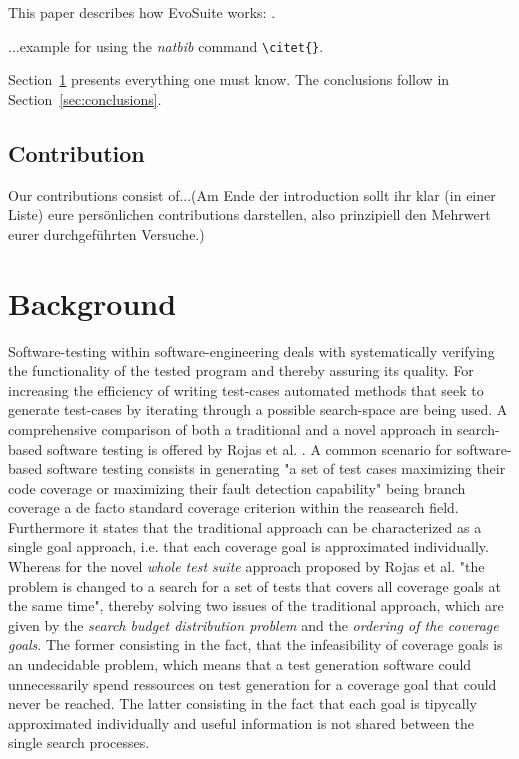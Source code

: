 \documentclass[pdftex,english,oribibl]{llncs}
\begin{document}
This paper describes how EvoSuite works: \citet{fraser2011evosuite}.



...example for using the \textit{natbib} command \texttt{\textbackslash{}citet\{\}}.

  Section~\ref{sec:anotherSection} presents everything one must know. The conclusions follow in Section~\ref{sec:conclusions}.

\subsection{Contribution}

Our contributions consist of...(Am Ende der introduction sollt ihr klar (in einer Liste) eure persönlichen contributions darstellen, also prinzipiell den Mehrwert eurer durchgeführten Versuche.)


\section{Background}\label{sec:anotherSection}
Software-testing within software-engineering deals with systematically verifying the functionality of the tested program and thereby assuring its quality. For increasing the efficiency of writing test-cases automated methods that seek to generate test-cases by iterating through a possible search-space are being used. A comprehensive comparison of both a traditional and a novel approach in search-based software testing is offered by Rojas et al. \citep{rojas2017detailed}. A common scenario for software-based software testing consists in generating "a set of test cases maximizing their code coverage or maximizing their fault detection capability" being branch coverage a de facto standard coverage criterion within the reasearch field. Furthermore it states that the traditional approach can be characterized as a single goal approach, i.e. that each coverage goal is approximated individually. Whereas for the novel \textit{whole test suite} approach proposed by Rojas et al. "the problem is changed to a search for a set of tests that covers all coverage goals at the same time", thereby solving two issues of the traditional approach, which are given by the \textit{search budget distribution problem} and the \textit{ordering of the coverage goals}. The former consisting in the fact, that the infeasibility of coverage goals is an undecidable problem, which means that a test generation software could unnecessarily spend ressources on test generation for a coverage goal that could never be reached. The latter consisting in the fact that each goal is tipycally approximated individually and useful information is not shared between the single search processes. 
\end{document}

